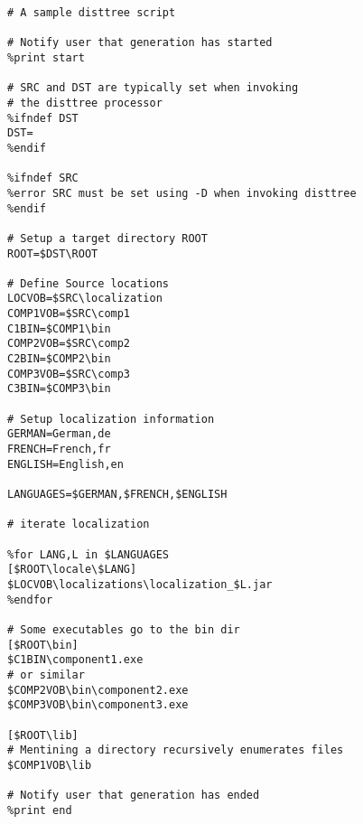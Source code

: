 \documentclass{article}
\begin{document}
\begin{verbatim}
# A sample disttree script

# Notify user that generation has started
%print start

# SRC and DST are typically set when invoking
# the disttree processor
%ifndef DST
DST=
%endif

%ifndef SRC
%error SRC must be set using -D when invoking disttree
%endif

# Setup a target directory ROOT
ROOT=$DST\ROOT

# Define Source locations
LOCVOB=$SRC\localization
COMP1VOB=$SRC\comp1
C1BIN=$COMP1\bin
COMP2VOB=$SRC\comp2
C2BIN=$COMP2\bin
COMP3VOB=$SRC\comp3
C3BIN=$COMP3\bin

# Setup localization information
GERMAN=German,de
FRENCH=French,fr
ENGLISH=English,en

LANGUAGES=$GERMAN,$FRENCH,$ENGLISH

# iterate localization

%for LANG,L in $LANGUAGES
[$ROOT\locale\$LANG]
$LOCVOB\localizations\localization_$L.jar
%endfor

# Some executables go to the bin dir
[$ROOT\bin]
$C1BIN\component1.exe
# or similar
$COMP2VOB\bin\component2.exe
$COMP3VOB\bin\component3.exe

[$ROOT\lib]
# Mentining a directory recursively enumerates files
$COMP1VOB\lib

# Notify user that generation has ended
%print end

\end{verbatim}
\end{document}
